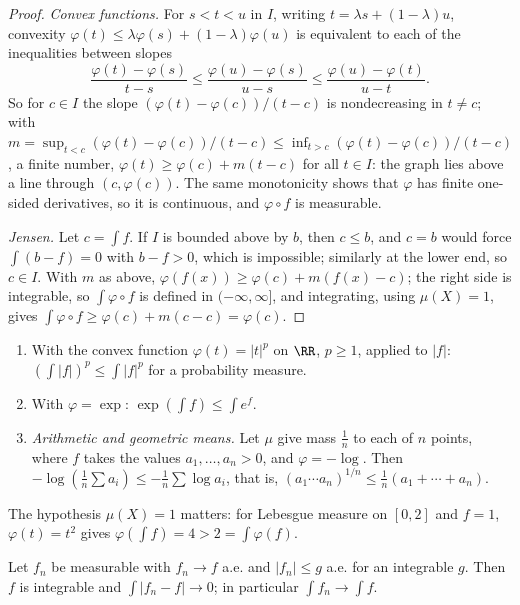 \begin{proof}
\emph{Convex functions.} For $s < t < u$ in $I$, writing $t = \lambda s + (1 - \lambda)u$, convexity $\varphi(t) \leq \lambda\varphi(s) + (1 - \lambda)\varphi(u)$ is equivalent to each of the inequalities
between slopes
\[
\frac{\varphi(t) - \varphi(s)}{t - s} \leq \frac{\varphi(u) - \varphi(s)}{u - s} \leq \frac{\varphi(u) - \varphi(t)}{u - t}.
\]
So for $c \in I$ the slope $(\varphi(t) - \varphi(c))/(t - c)$ is nondecreasing in $t \neq c$; with $m = \sup_{t < c}(\varphi(t) - \varphi(c))/(t - c) \leq \inf_{t > c}(\varphi(t) - \varphi(c))/(t - c)$,
a finite number, $\varphi(t) \geq \varphi(c) + m(t - c)$ for all $t \in I$: the graph lies above a line through $(c, \varphi(c))$. The same monotonicity shows that $\varphi$ has finite one-sided
derivatives, so it is continuous, and $\varphi \circ f$ is measurable.

\emph{Jensen.} Let $c = \int f$. If $I$ is bounded above by $b$, then $c \leq b$, and $c = b$ would force $\int(b - f) = 0$ with $b - f > 0$, which is impossible; similarly at the lower end, so
$c \in I$. With $m$ as above, $\varphi(f(x)) \geq \varphi(c) + m(f(x) - c)$; the right side is integrable, so $\int\varphi \circ f$ is defined in $(-\infty, \infty]$, and integrating, using $\mu(X) = 1$,
gives $\int\varphi \circ f \geq \varphi(c) + m(c - c) = \varphi(c)$.
\end{proof}

\begin{example}\label{measure-theory:example-jensen}
\begin{enumerate}
\item With the convex function $\varphi(t) = |t|^p$ on $\RR$, $p \geq 1$, applied to $|f|$: $(\int|f|)^p \leq \int|f|^p$ for a probability measure.
\item With $\varphi = \exp$: $\exp(\int f) \leq \int e^f$.
\item \emph{Arithmetic and geometric means.} Let $\mu$ give mass $\frac1n$ to each of $n$ points, where $f$ takes the values $a_1, \ldots, a_n > 0$, and $\varphi = -\log$. Then
$-\log(\frac1n\sum a_i) \leq -\frac1n\sum\log a_i$, that is, $(a_1\cdots a_n)^{1/n} \leq \frac1n(a_1 + \cdots + a_n)$.
\end{enumerate}
The hypothesis $\mu(X) = 1$ matters: for Lebesgue measure on $[0, 2]$ and $f = 1$, $\varphi(t) = t^2$ gives $\varphi(\int f) = 4 > 2 = \int\varphi(f)$.
\end{example}

\begin{theorem}\label{measure-theory:theorem-dominated-convergence}
Let $f_n$ be measurable with $f_n \to f$ a.e. and $|f_n| \leq g$ a.e. for an integrable $g$. Then $f$ is integrable and $\int|f_n - f| \to 0$; in particular $\int f_n \to \int f$.
\end{theorem}

